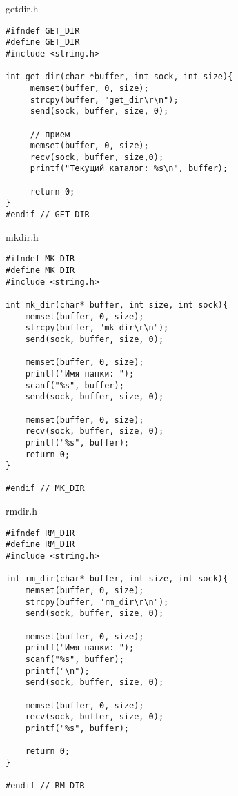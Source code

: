 \documentclass[12pt,a4paper]{report}
\begin{document}
getdir.h
\begin{lstlisting}
#ifndef GET_DIR
#define GET_DIR
#include <string.h>

int get_dir(char *buffer, int sock, int size){
     memset(buffer, 0, size);
     strcpy(buffer, "get_dir\r\n");
     send(sock, buffer, size, 0);

     // прием
     memset(buffer, 0, size);
     recv(sock, buffer, size,0);
     printf("Текущий каталог: %s\n", buffer);

     return 0;
}
#endif // GET_DIR
\end{lstlisting}

mkdir.h
\begin{lstlisting}
#ifndef MK_DIR
#define MK_DIR
#include <string.h>

int mk_dir(char* buffer, int size, int sock){
    memset(buffer, 0, size);
    strcpy(buffer, "mk_dir\r\n");
    send(sock, buffer, size, 0);

    memset(buffer, 0, size);
    printf("Имя папки: ");
    scanf("%s", buffer);
    send(sock, buffer, size, 0);

    memset(buffer, 0, size);
    recv(sock, buffer, size, 0);
    printf("%s", buffer);
    return 0;
}

#endif // MK_DIR
\end{lstlisting}

rmdir.h
\begin{lstlisting}
#ifndef RM_DIR
#define RM_DIR
#include <string.h>

int rm_dir(char* buffer, int size, int sock){
    memset(buffer, 0, size);
    strcpy(buffer, "rm_dir\r\n");
    send(sock, buffer, size, 0);

    memset(buffer, 0, size);
    printf("Имя папки: ");
    scanf("%s", buffer);
    printf("\n");
    send(sock, buffer, size, 0);

    memset(buffer, 0, size);
    recv(sock, buffer, size, 0);
    printf("%s", buffer);

    return 0;
}

#endif // RM_DIR
\end{lstlisting}
\end{document}
